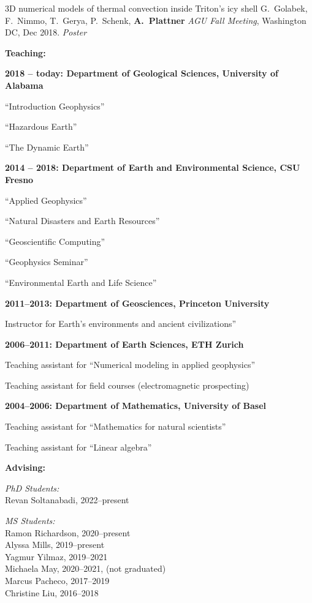 \documentclass[10pt]{article}
\begin{document}
\spcp 3D numerical models of thermal convection inside Triton's icy
shell G.~Golabek, F.~Nimmo, T.~Gerya, P.~Schenk, \textbf{A.~Plattner}
\emph{AGU Fall Meeting}, Washington DC, Dec 2018. \emph{Poster}





\spc
\textbf{\tsize Teaching:}

\spcp
\textbf{2018 -- today: Department of Geological Sciences,
University of Alabama}

``Introduction Geophysics''

``Hazardous Earth''

``The Dynamic Earth''


\spcp
\textbf{2014 -- 2018:  Department of Earth and Environmental Science, CSU Fresno}

``Applied Geophysics''

``Natural Disasters and Earth Resources''

``Geoscientific Computing''

``Geophysics Seminar''

``Environmental Earth and Life Science''


\spcp
\textbf{2011--2013:  Department of Geosciences, Princeton University}

Instructor for Earth's environments and ancient civilizations''

\spcp
\textbf{2006--2011: Department of Earth Sciences, ETH Zurich}

Teaching assistant for ``Numerical modeling in applied geophysics''
     
Teaching assistant for field courses (electromagnetic prospecting)

\spcp
\textbf{2004--2006: Department of Mathematics, University of Basel}

Teaching assistant for ``Mathematics for natural scientists''

Teaching assistant for ``Linear algebra''


\spc
\textbf{\tsize Advising:}

\spcp
\emph{PhD Students:}\\
Revan Soltanabadi, 2022--present 

\spcp
\emph{MS Students:}\\
Ramon Richardson, 2020--present\\
Alyssa Mills, 2019--present \\
Yagmur Yilmaz, 2019--2021 \\
Michaela May, 2020--2021, (not graduated) \\
Marcus Pacheco, 2017--2019 \\
Christine Liu, 2016--2018 
\end{document}
